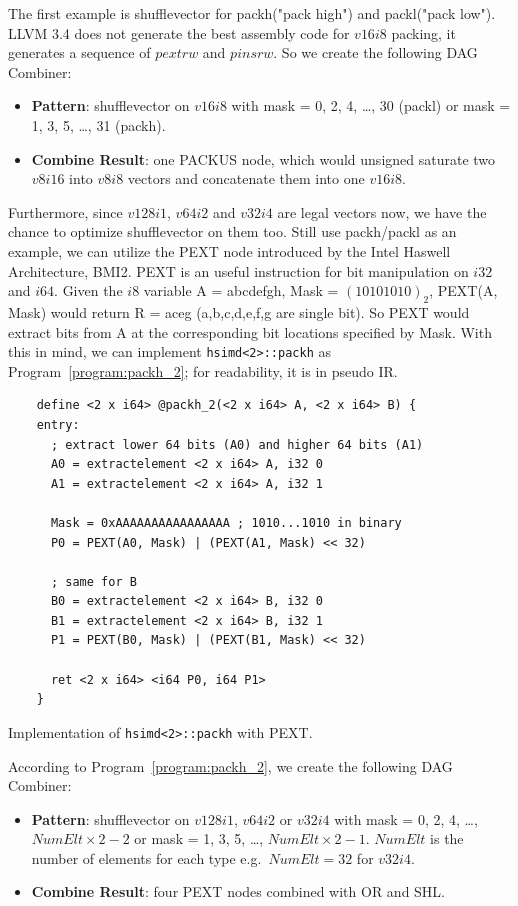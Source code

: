 The first example is shufflevector for packh("pack high") and packl("pack low"). LLVM 3.4 does not generate the best assembly code for $v16i8$ packing, it generates a sequence of $pextrw$ and $pinsrw$. So we create the following DAG Combiner:
\begin{itemize}
    \item \textbf{Pattern}: shufflevector on $v16i8$ with mask = 0, 2, 4, \ldots, 30 (packl) or mask = 1, 3, 5, \ldots, 31 (packh).
    \item \textbf{Combine Result}: one PACKUS node, which would unsigned saturate two $v8i16$ into $v8i8$ vectors and concatenate them into one $v16i8$.
\end{itemize}

Furthermore, since $v128i1$, $v64i2$ and $v32i4$ are legal vectors now, we have the chance to optimize shufflevector on them too. Still use packh/packl as an example, we can utilize the PEXT node introduced by the Intel Haswell Architecture, BMI2. PEXT is an useful instruction for bit manipulation on $i32$ and $i64$. Given the $i8$ variable A = abcdefgh, Mask = $(10101010)_2$, PEXT(A, Mask) would return R = aceg (a,b,c,d,e,f,g are single bit). So PEXT would extract bits from A at the corresponding bit locations specified by Mask. With this in mind, we can implement \verb|hsimd<2>::packh| as Program~\ref{program:packh_2}; for readability, it is in pseudo IR.

\begin{program}
\begin{verbatim}
    define <2 x i64> @packh_2(<2 x i64> A, <2 x i64> B) {
    entry:
      ; extract lower 64 bits (A0) and higher 64 bits (A1)
      A0 = extractelement <2 x i64> A, i32 0
      A1 = extractelement <2 x i64> A, i32 1

      Mask = 0xAAAAAAAAAAAAAAAA ; 1010...1010 in binary
      P0 = PEXT(A0, Mask) | (PEXT(A1, Mask) << 32)

      ; same for B
      B0 = extractelement <2 x i64> B, i32 0
      B1 = extractelement <2 x i64> B, i32 1
      P1 = PEXT(B0, Mask) | (PEXT(B1, Mask) << 32)

      ret <2 x i64> <i64 P0, i64 P1>
    }
\end{verbatim}
\caption{Implementation of {\tt hsimd<2>::packh} with PEXT.}
\label{program:packh_2}
\end{program}

According to Program~\ref{program:packh_2}, we create the following DAG Combiner:
\begin{itemize}
    \item \textbf{Pattern}: shufflevector on $v128i1$, $v64i2$ or $v32i4$ with mask = 0, 2, 4, \ldots, $NumElt \times 2-2$ or mask = 1, 3, 5, \ldots, $NumElt \times 2 -1$. $NumElt$ is the number of elements for each type e.g.\ $NumElt=32$ for $v32i4$.
    \item \textbf{Combine Result}: four PEXT nodes combined with OR and SHL.
\end{itemize}

